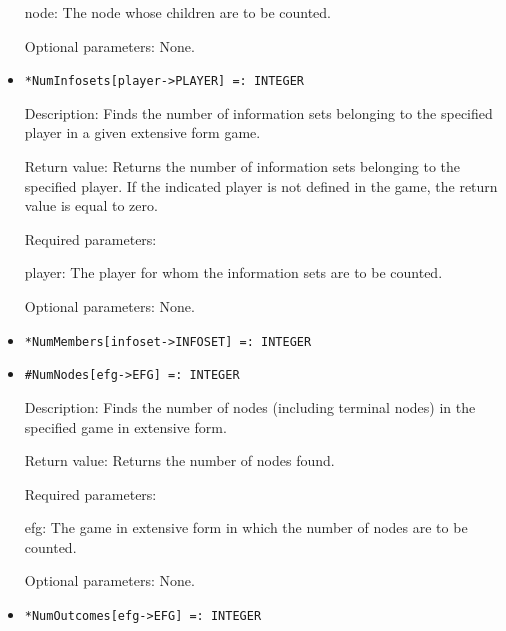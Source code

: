 \begin{itemize}
\bd
\item
[node:] The node whose children are to be counted.
\ed

\item
[Optional parameters:] None.
\ed

\item
\protect \large \begin{verbatim}
*NumInfosets[player->PLAYER] =: INTEGER
\end{verbatim}\normalsize

\bd
\item
[Description:] Finds the number of information sets belonging to the
specified player in a given extensive form game.
\item
[Return value:] Returns the number of information sets belonging to
the specified player.  If the indicated player is not defined in the
game, the return value is equal to zero.
\item
[Required parameters:]\hfil\null

\bd
\item
[player:] The player for whom the information sets are to be counted.
\item
 [Optional parameters:] None.
\ed
\ed

\item
\protect \large \begin{verbatim}
*NumMembers[infoset->INFOSET] =: INTEGER
\end{verbatim}\normalsize

\item
\protect \large \begin{verbatim}
#NumNodes[efg->EFG] =: INTEGER
\end{verbatim}\normalsize

\bd
\item
[Description:] Finds the number of nodes (including terminal nodes) in
the specified game in extensive form.
\item
[Return value:] Returns the number of nodes found.
\item
[Required parameters:]\hfil\null

\bd
\item
[efg:] The game in extensive form in which the number of nodes are to
be counted.
\ed

\item
[Optional parameters:] None.
\ed

\item
\protect \large \begin{verbatim}
*NumOutcomes[efg->EFG] =: INTEGER
\end{verbatim} \normalsize


\end{itemize}
